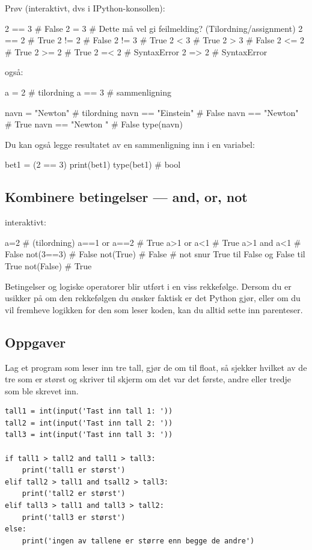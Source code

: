 Prøv (interaktivt, dvs i IPython-konsollen):
\begin{usncodebox}
2 == 3   # False
2 = 3    # Dette må vel gi feilmelding? (Tilordning/assignment)
2 == 2   # True
2 != 2   # False
2 != 3   # True
2 < 3    # True
2 > 3    # False
2 <= 2   # True
2 >= 2   # True
2 =< 2   # SyntaxError
2 => 2   # SyntaxError
\end{usncodebox}

også:
\begin{usncodebox}
a = 2    # tilordning
a == 3   # sammenligning

navn = "Newton"       # tilordning
navn == "Einstein"    # False 
navn == "Newton"      # True
navn == "Newton "     # False
type(navn)
\end{usncodebox}

Du kan også legge resultatet av en sammenligning inn i en variabel:
\begin{usncodebox}
bet1 = (2 == 3)   
print(bet1)
type(bet1)   # bool
\end{usncodebox}

\subsection{Kombinere betingelser --- and, or, not}

interaktivt:
\begin{usncodebox}
a=2             # (tilordning)
a==1 or a==2    # True 
a>1  or  a<1    # True 
a>1  and a<1    # False
not(3==3)       # False
not(True)       # False  # not snur True til False og False til True
not(False)      # True 
\end{usncodebox}

Betingelser og logiske operatorer blir utført i en viss rekkefølge. Dersom du er usikker på om den rekkefølgen du ønsker faktisk er det Python gjør, eller om du vil fremheve logikken for den som leser koden, kan du alltid sette inn parenteser.

\subsection{Oppgaver}

\begin{exercise}
Lag et program som leser inn tre tall, gjør de om til float, så sjekker hvilket av de tre som er størst og skriver til skjerm om det var det første, andre eller tredje som ble skrevet inn.
\end{exercise}
\begin{solution}
\begin{lstlisting}
tall1 = int(input('Tast inn tall 1: '))
tall2 = int(input('Tast inn tall 2: '))
tall3 = int(input('Tast inn tall 3: '))

if tall1 > tall2 and tall1 > tall3:
    print('tall1 er størst')
elif tall2 > tall1 and tsall2 > tall3:
    print('tall2 er størst')
elif tall3 > tall1 and tall3 > tall2:
    print('tall3 er størst')
else:
    print('ingen av tallene er større enn begge de andre')
\end{lstlisting}
\end{solution}

